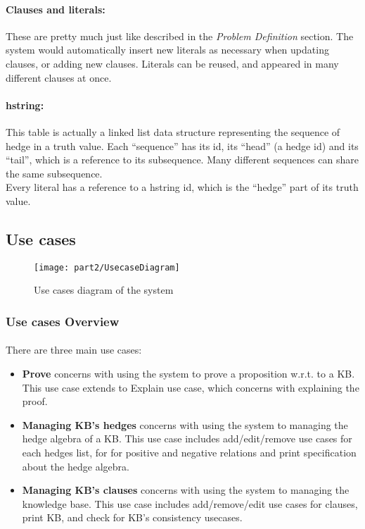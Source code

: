 \documentclass[../gr-final.tex]{subfiles}
\begin{document}
\paragraph{Clauses and literals:}
These are pretty much just like described in the {\em Problem
  Definition} section. The system would automatically insert new
literals as necessary when updating clauses, or adding new
clauses. Literals can be reused, and appeared in many different
clauses at once. 
\paragraph{hstring:}
This table is actually a linked list data structure representing
the sequence of hedge in a truth value. Each ``sequence'' has its id,
its ``head'' (a hedge id) and its ``tail'', which is a reference to
its subsequence. Many different sequences can share the same
subsequence.\\
Every literal has a reference to a hstring id, which is the ``hedge'' part
of its truth value.
\subsection{Use cases}

\begin{figure}[H]
\texttt{[image: part2/UsecaseDiagram]}
\caption{Use cases diagram of the system}
\end{figure}

\subsubsection{Use cases Overview}
\paragraph{} There are three main use cases:
\begin{itemize}
  \item {\bfseries Prove} concerns with using the system to prove
    a proposition w.r.t. to a KB. This use case extends to
    Explain use case,
    which concerns with explaining the proof.    
  \item {\bfseries Managing KB's hedges} concerns with using the
    system to managing the hedge algebra of a KB. This use case
    includes add/edit/remove use cases for each hedges list, for
    for positive and negative relations and print specification
    about the hedge algebra.
  \item {\bfseries Managing KB's clauses} concerns with using the
    system to managing the knowledge base. This use case includes
    add/remove/edit use cases for clauses, print KB, and check
    for KB's consistency usecases.    
\end{itemize}
\end{document}
